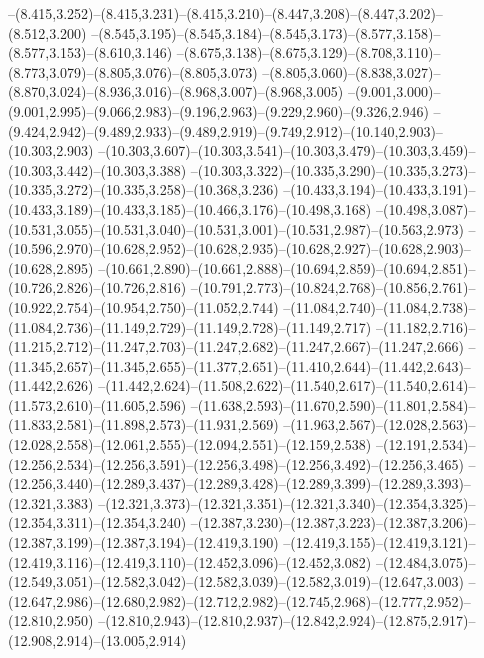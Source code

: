   --(8.415,3.252)--(8.415,3.231)--(8.415,3.210)--(8.447,3.208)--(8.447,3.202)--(8.512,3.200)%
  --(8.545,3.195)--(8.545,3.184)--(8.545,3.173)--(8.577,3.158)--(8.577,3.153)--(8.610,3.146)%
  --(8.675,3.138)--(8.675,3.129)--(8.708,3.110)--(8.773,3.079)--(8.805,3.076)--(8.805,3.073)%
  --(8.805,3.060)--(8.838,3.027)--(8.870,3.024)--(8.936,3.016)--(8.968,3.007)--(8.968,3.005)%
  --(9.001,3.000)--(9.001,2.995)--(9.066,2.983)--(9.196,2.963)--(9.229,2.960)--(9.326,2.946)%
  --(9.424,2.942)--(9.489,2.933)--(9.489,2.919)--(9.749,2.912)--(10.140,2.903)--(10.303,2.903)%
  --(10.303,3.607)--(10.303,3.541)--(10.303,3.479)--(10.303,3.459)--(10.303,3.442)--(10.303,3.388)%
  --(10.303,3.322)--(10.335,3.290)--(10.335,3.273)--(10.335,3.272)--(10.335,3.258)--(10.368,3.236)%
  --(10.433,3.194)--(10.433,3.191)--(10.433,3.189)--(10.433,3.185)--(10.466,3.176)--(10.498,3.168)%
  --(10.498,3.087)--(10.531,3.055)--(10.531,3.040)--(10.531,3.001)--(10.531,2.987)--(10.563,2.973)%
  --(10.596,2.970)--(10.628,2.952)--(10.628,2.935)--(10.628,2.927)--(10.628,2.903)--(10.628,2.895)%
  --(10.661,2.890)--(10.661,2.888)--(10.694,2.859)--(10.694,2.851)--(10.726,2.826)--(10.726,2.816)%
  --(10.791,2.773)--(10.824,2.768)--(10.856,2.761)--(10.922,2.754)--(10.954,2.750)--(11.052,2.744)%
  --(11.084,2.740)--(11.084,2.738)--(11.084,2.736)--(11.149,2.729)--(11.149,2.728)--(11.149,2.717)%
  --(11.182,2.716)--(11.215,2.712)--(11.247,2.703)--(11.247,2.682)--(11.247,2.667)--(11.247,2.666)%
  --(11.345,2.657)--(11.345,2.655)--(11.377,2.651)--(11.410,2.644)--(11.442,2.643)--(11.442,2.626)%
  --(11.442,2.624)--(11.508,2.622)--(11.540,2.617)--(11.540,2.614)--(11.573,2.610)--(11.605,2.596)%
  --(11.638,2.593)--(11.670,2.590)--(11.801,2.584)--(11.833,2.581)--(11.898,2.573)--(11.931,2.569)%
  --(11.963,2.567)--(12.028,2.563)--(12.028,2.558)--(12.061,2.555)--(12.094,2.551)--(12.159,2.538)%
  --(12.191,2.534)--(12.256,2.534)--(12.256,3.591)--(12.256,3.498)--(12.256,3.492)--(12.256,3.465)%
  --(12.256,3.440)--(12.289,3.437)--(12.289,3.428)--(12.289,3.399)--(12.289,3.393)--(12.321,3.383)%
  --(12.321,3.373)--(12.321,3.351)--(12.321,3.340)--(12.354,3.325)--(12.354,3.311)--(12.354,3.240)%
  --(12.387,3.230)--(12.387,3.223)--(12.387,3.206)--(12.387,3.199)--(12.387,3.194)--(12.419,3.190)%
  --(12.419,3.155)--(12.419,3.121)--(12.419,3.116)--(12.419,3.110)--(12.452,3.096)--(12.452,3.082)%
  --(12.484,3.075)--(12.549,3.051)--(12.582,3.042)--(12.582,3.039)--(12.582,3.019)--(12.647,3.003)%
  --(12.647,2.986)--(12.680,2.982)--(12.712,2.982)--(12.745,2.968)--(12.777,2.952)--(12.810,2.950)%
  --(12.810,2.943)--(12.810,2.937)--(12.842,2.924)--(12.875,2.917)--(12.908,2.914)--(13.005,2.914)%

